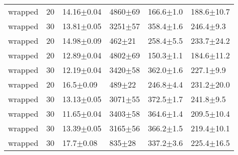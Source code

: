 \begin{tabular}{lrllll}
      wrapped &      20 &   14.16$\pm$0.04 &  4860$\pm$69 &   166.6$\pm$1.0 &  188.6$\pm$10.7 \\
      wrapped &      30 &   13.81$\pm$0.05 &  3251$\pm$57 &   358.4$\pm$1.6 &   246.4$\pm$9.3 \\
      wrapped &      20 &   14.98$\pm$0.09 &   462$\pm$21 &   258.4$\pm$5.5 &  233.7$\pm$24.2 \\
      wrapped &      20 &   12.89$\pm$0.04 &  4802$\pm$69 &   150.3$\pm$1.1 &  184.6$\pm$11.2 \\
      wrapped &      30 &   12.19$\pm$0.04 &  3420$\pm$58 &   362.0$\pm$1.6 &   227.1$\pm$9.9 \\
      wrapped &      20 &    16.5$\pm$0.09 &   489$\pm$22 &   246.8$\pm$4.4 &  231.2$\pm$20.0 \\
      wrapped &      30 &   13.13$\pm$0.05 &  3071$\pm$55 &   372.5$\pm$1.7 &   241.8$\pm$9.5 \\
      wrapped &      30 &   11.65$\pm$0.04 &  3403$\pm$58 &   364.6$\pm$1.4 &  209.5$\pm$10.4 \\
      wrapped &      30 &   13.39$\pm$0.05 &  3165$\pm$56 &   366.2$\pm$1.5 &  219.4$\pm$10.1 \\
      wrapped &      30 &    17.7$\pm$0.08 &   835$\pm$28 &   337.2$\pm$3.6 &  225.4$\pm$16.5 \\
\hline
\end{tabular}
